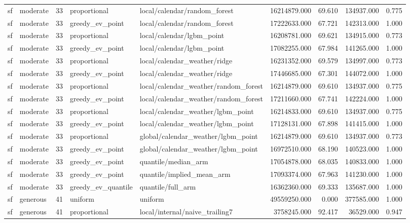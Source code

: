 \begin{tabular}{llrllrrrr}
sf & moderate & 33 & proportional & local/calendar/random\_forest & 16214879.000 & 69.610 & 134937.000 & 0.775 \\
sf & moderate & 33 & greedy\_ev\_point & local/calendar/random\_forest & 17222633.000 & 67.721 & 142313.000 & 1.000 \\
sf & moderate & 33 & proportional & local/calendar/lgbm\_point & 16208781.000 & 69.621 & 134915.000 & 0.773 \\
sf & moderate & 33 & greedy\_ev\_point & local/calendar/lgbm\_point & 17082255.000 & 67.984 & 141265.000 & 1.000 \\
sf & moderate & 33 & proportional & local/calendar\_weather/ridge & 16231352.000 & 69.579 & 134997.000 & 0.773 \\
sf & moderate & 33 & greedy\_ev\_point & local/calendar\_weather/ridge & 17446685.000 & 67.301 & 144072.000 & 1.000 \\
sf & moderate & 33 & proportional & local/calendar\_weather/random\_forest & 16214879.000 & 69.610 & 134937.000 & 0.775 \\
sf & moderate & 33 & greedy\_ev\_point & local/calendar\_weather/random\_forest & 17211660.000 & 67.741 & 142224.000 & 1.000 \\
sf & moderate & 33 & proportional & local/calendar\_weather/lgbm\_point & 16214833.000 & 69.610 & 134937.000 & 0.775 \\
sf & moderate & 33 & greedy\_ev\_point & local/calendar\_weather/lgbm\_point & 17128131.000 & 67.898 & 141415.000 & 1.000 \\
sf & moderate & 33 & proportional & global/calendar\_weather/lgbm\_point & 16214879.000 & 69.610 & 134937.000 & 0.773 \\
sf & moderate & 33 & greedy\_ev\_point & global/calendar\_weather/lgbm\_point & 16972510.000 & 68.190 & 140523.000 & 1.000 \\
sf & moderate & 33 & greedy\_ev\_point & quantile/median\_arm & 17054878.000 & 68.035 & 140833.000 & 1.000 \\
sf & moderate & 33 & greedy\_ev\_point & quantile/implied\_mean\_arm & 17093374.000 & 67.963 & 141230.000 & 1.000 \\
sf & moderate & 33 & greedy\_ev\_quantile & quantile/full\_arm & 16362360.000 & 69.333 & 135687.000 & 1.000 \\
sf & generous & 41 & uniform & uniform & 49559250.000 & 0.000 & 377585.000 & 1.000 \\
sf & generous & 41 & proportional & local/internal/naive\_trailing7 & 3758245.000 & 92.417 & 36529.000 & 0.947 \\

\end{tabular}
